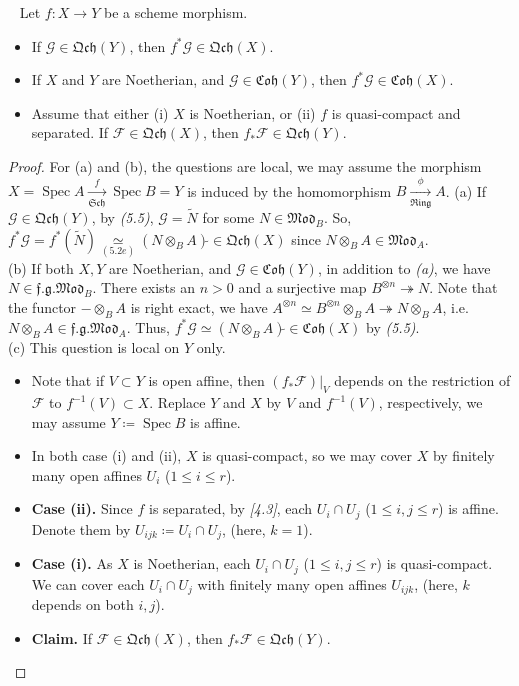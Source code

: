 \documentclass[11pt,a4paper,footinclude=true,headinclude=true]{scrbook} %
\DeclareMathOperator{\Spec}{Spec}
\newcommand{\FF}{\mathscr{F}}
\newcommand{\GG}{\mathscr{G}}
\newcommand{\Sch}{\mathfrak{Sch}}
\newcommand{\Ring}{\mathfrak{Ring}}
\newcommand{\<}{\langle}
\newcommand{\>}{\rangle}
\newcommand{\fg}{\mathfrak{f.g.}}
\newcommand{\MOD}{\mathfrak{Mod}}
\newcommand{\qcoh}{\mathfrak{Qch}}
\newcommand{\coh}{\mathfrak{Coh}}
\newenvironment{proposition}[2][]
{\renewcommand\theinnercustomprop{#2}\innercustomprop[#1] 
\begin{mdframed}[backgroundcolor=gray!20]\ }
{\end{mdframed}\endinnercustomprop}
\begin{document}
\begin{proposition}{5.8}
    Let $f:X\to Y$ be a scheme morphism.
    \begin{itemize}
        \item[(a)] If $\GG\in\qcoh(Y)$, then $f^\ast\GG\in\qcoh(X)$.
        \item[(b)] If $X$ and $Y$ are Noetherian, and $\GG\in\coh(Y)$, then $f^\ast\GG\in\coh(X)$.
        \item[(c)] Assume that either (i) $X$ is Noetherian, or (ii) $f$ is quasi-compact and separated. If $\FF\in\qcoh(X)$, then $f_\ast\FF\in\qcoh(Y)$.
    \end{itemize}
\end{proposition}
\begin{proof}
    For (a) and (b), the questions are local, we may assume the morphism $X=\Spec A\xrightarrow[\Sch]{f}\Spec B=Y$ is induced by the homomorphism $B\xrightarrow[\Ring]{\phi}A$.
    \newline
    (a) If $\GG\in\qcoh(Y)$, by \textit{(5.5)}, $\GG=\widetilde{N}$ for some $N\in \MOD_B$. So, $f^\ast\GG=f^\ast(\widetilde{N})\underset{(5.2e)}{\simeq}(N\otimes_BA)\widetilde{}\in\qcoh(X)$ since $N\otimes_BA\in \MOD_A$.\\
    \newline
    (b) If both $X,Y$ are Noetherian, and $\GG\in\coh(Y)$, in addition to \textit{(a)}, we have $N\in\fg\MOD_B$. There exists an $n>0$ and a surjective map $B^{\otimes n}\twoheadrightarrow N$. Note that the functor $-\otimes_BA$ is right exact, we have $A^{\otimes n}\simeq B^{\otimes n}\otimes_BA\twoheadrightarrow N\otimes_BA$, i.e. $N\otimes_BA\in\fg\MOD_A$. Thus, $f^\ast\GG\simeq(N\otimes_BA)\widetilde{}\in\coh(X)$ by \textit{(5.5)}.\\
    \newline
    (c) This question is local on $Y$ only. 
    \begin{itemize}
        \item Note that if $V\subset Y$ is open affine, then $(f_\ast\FF)|_V$ depends on the restriction of $\FF$ to $f^{-1}(V)\subset X$. Replace $Y$ and $X$ by $V$ and $f^{-1}(V)$, respectively, we may assume $Y\coloneqq\Spec B$ is affine.
        \item In both case (i) and (ii), $X$ is quasi-compact, so we may cover $X$ by finitely many open affines $U_i$ ($1\leq i\leq r$).
        \item \textbf{Case (ii).} Since $f$ is separated, by \textit{[4.3]}, each $U_i\cap U_j$ ($1\leq i,j\leq r$) is affine. Denote them by $U_{ijk}\coloneqq U_i\cap U_j$, (here, $k=1$).
        \item \textbf{Case (i).} As $X$ is Noetherian, each $U_i\cap U_j$ ($1\leq i,j\leq r$) is quasi-compact. We can cover each $U_i\cap U_j$ with finitely many open affines $U_{ijk}$, (here, $k$ depends on both $i,j$).
        \item \textbf{Claim.} If $\FF\in\qcoh(X)$, then $f_\ast\FF\in\qcoh(Y)$.
        

\end{itemize}
\end{proof}
\end{document}
